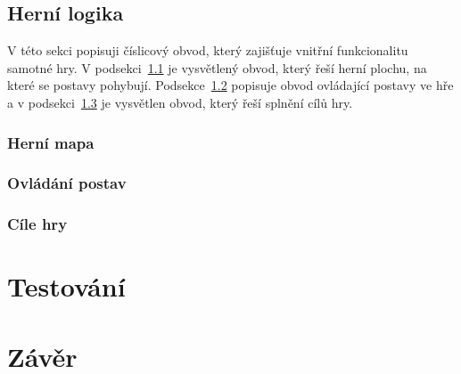 \documentclass{report}
\begin{document}
\section{Herní logika}\label{sec:hernilogika}
V této sekci popisuji číslicový obvod, který zajišťuje vnitřní funkcionalitu samotné hry. V podsekci~\ref{sec:hernimapa} je vysvětlený obvod, který řeší herní plochu, na které se postavy pohybují. Podsekce~\ref{sec:ovladanipostav} popisuje obvod ovládající postavy ve hře a v podsekci~\ref{sec:cilehry} je vysvětlen obvod, který řeší splnění cílů hry.
\subsection{Herní mapa}\label{sec:hernimapa}
\subsection{Ovládání postav}\label{sec:ovladanipostav}
\subsection{Cíle hry}\label{sec:cilehry}

\chapter{Testování}

 \chapter*{Závěr}



\end{document}
